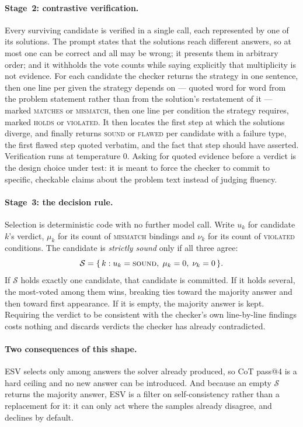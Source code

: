 \paragraph{Stage~2: contrastive verification.}
\label{sec:verify}
Every surviving candidate is verified in a single call, each represented by one
of its solutions. The prompt states that the solutions reach different answers,
so at most one can be correct and all may be wrong; it presents them in
arbitrary order; and it withholds the vote counts while saying explicitly that
multiplicity is not evidence. For each candidate the checker returns the
strategy in one sentence, then one line per given the strategy depends on ---
quoted word for word from the problem statement rather than from the solution's
restatement of it --- marked \textsc{matches} or \textsc{mismatch}, then one
line per condition the strategy requires, marked \textsc{holds} or
\textsc{violated}. It then locates the first step at which the solutions
diverge, and finally returns \textsc{sound} or \textsc{flawed} per candidate
with a failure type, the first flawed step quoted verbatim, and the fact that
step should have asserted. Verification runs at temperature $0$. Asking for
quoted evidence before a verdict is the design choice under test: it is meant
to force the checker to commit to specific, checkable claims about the problem
text instead of judging fluency.

\paragraph{Stage~3: the decision rule.}
\label{sec:decide}
Selection is deterministic code with no further model call. Write $u_k$ for
candidate $k$'s verdict, $\mu_k$ for its count of \textsc{mismatch} bindings
and $\nu_k$ for its count of \textsc{violated} conditions. The candidate is
\emph{strictly sound} only if all three agree:
\begin{equation}
  \mathcal{S} = \{\, k : u_k = \textsc{sound},\; \mu_k = 0,\; \nu_k = 0 \,\}.
  \label{eq:strict}
\end{equation}
If $\mathcal{S}$ holds exactly one candidate, that candidate is committed. If
it holds several, the most-voted among them wins, breaking ties toward the
majority answer and then toward first appearance. If it is empty, the majority
answer is kept. Requiring the verdict to be consistent with the checker's own
line-by-line findings costs nothing and discards verdicts the checker has
already contradicted.

\paragraph{Two consequences of this shape.}
ESV selects only among answers the solver already produced, so CoT pass@4 is a
hard ceiling and no new answer can be introduced. And because an empty
$\mathcal{S}$ returns the majority answer, ESV is a filter on self-consistency
rather than a replacement for it: it can only act where the samples already
disagree, and declines by default.

